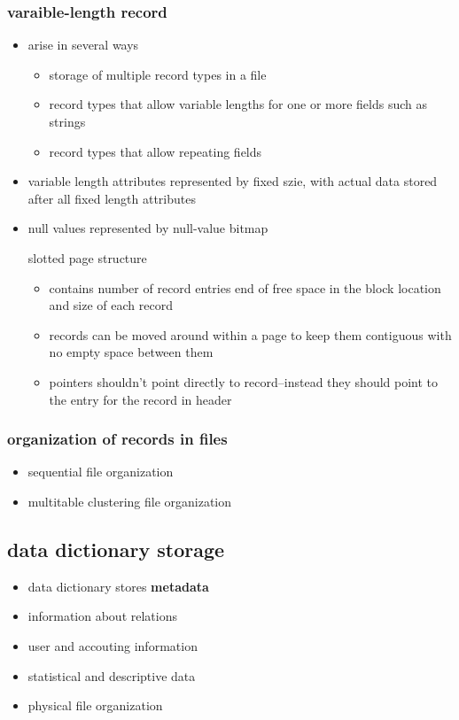 \documentclass[11pt]{article}
\begin{document}
\subsubsection{varaible-length record}
\label{sec-14-4-2}
\begin{itemize}
\item arise in several ways
\begin{itemize}
\item storage of multiple record types in a file
\item record types that allow variable lengths for one or more fields such as strings
\item record types that allow repeating fields
\end{itemize}
\item variable length attributes represented by fixed szie, with actual data stored after
all fixed length attributes
\item null values represented by null-value bitmap
\item[{slotted page structure}] \begin{itemize}
\item contains
number of record entries
end of free space in the block
location and size of each record
\item records can be moved around within a page to keep them contiguous with no empty space
between them
\item pointers shouldn't point directly to record--instead they should point to the entry
for the record in header
\end{itemize}
\end{itemize}
\subsubsection{organization of records in files}
\label{sec-14-4-3}
\begin{itemize}
\item sequential file organization
\item multitable clustering file organization
\end{itemize}
\subsection{data dictionary storage}
\label{sec-14-5}
\begin{itemize}
\item data dictionary stores \textbf{metadata}
\item information about relations
\item user and accouting information
\item statistical and descriptive data
\item physical file organization
\end{itemize}
\end{document}
